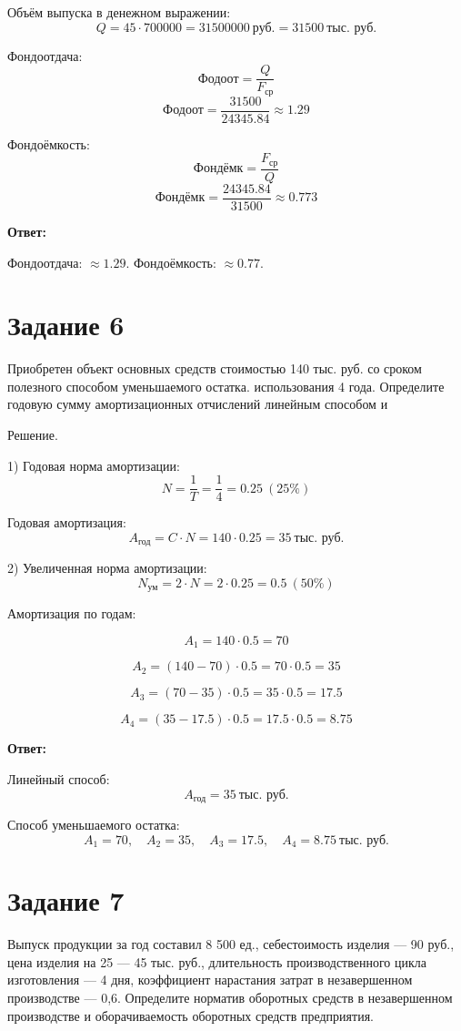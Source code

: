 \documentclass[14pt,a4paper]{extarticle}
\begin{document}
Объём выпуска в денежном выражении:
\[
Q = 45 \cdot 700000 = 31500000\ \text{руб.} = 31500\ \text{тыс.~руб.}
\]

Фондоотдача:
\[
\text{Фодоот} = \frac{Q}{F_{\text{ср}}}
\]
\[
\text{Фодоот} = \frac{31500}{24345.84} \approx 1.29
\]

Фондоёмкость:
\[
\text{Фондёмк} = \frac{F_{\text{ср}}}{Q}
\]
\[
\text{Фондёмк} = \frac{24345.84}{31500} \approx 0.773
\]

\textbf{Ответ:}

Фондоотдача: \( \approx 1.29 \).
Фондоёмкость: \( \approx 0.77 \).

\section{Задание 6}
Приобретен объект основных средств стоимостью 140 тыс. руб. со сроком полезного
способом уменьшаемого остатка.
использования 4 года.
Определите годовую сумму амортизационных отчислений линейным способом и

Решение.

1) Годовая норма амортизации:
\[
N = \frac{1}{T} = \frac{1}{4} = 0.25 \ (25\%)
\]

Годовая амортизация:
\[
A_{\text{год}} = C \cdot N = 140 \cdot 0.25 = 35\ \text{тыс.~руб.}
\]

2) Увеличенная норма амортизации:
\[
N_{\text{ум}} = 2 \cdot N = 2 \cdot 0.25 = 0.5 \ (50\%)
\]

Амортизация по годам:

\[
A_1 = 140 \cdot 0.5 = 70
\]

\[
A_2 = (140 - 70) \cdot 0.5 = 70 \cdot 0.5 = 35
\]

\[
A_3 = (70 - 35) \cdot 0.5 = 35 \cdot 0.5 = 17.5
\]

\[
A_4 = (35 - 17.5) \cdot 0.5 = 17.5 \cdot 0.5 = 8.75
\]

\textbf{Ответ:}

Линейный способ:
\[
A_{\text{год}} = 35\ \text{тыс.~руб.}
\]

Способ уменьшаемого остатка:
\[
A_1 = 70,\quad A_2 = 35,\quad A_3 = 17.5,\quad A_4 = 8.75\ \text{тыс.~руб.}
\]

\section{Задание 7}
Выпуск продукции за год составил 8 500 ед., себестоимость изделия — 90 руб., цена
изделия на 25 %
— 45 тыс. руб., длительность производственного цикла изготовления — 4 дня,
коэффициент нарастания затрат в незавершенном производстве — 0,6. Определите
норматив оборотных средств в незавершенном производстве и оборачиваемость
оборотных средств предприятия.
\end{document}
